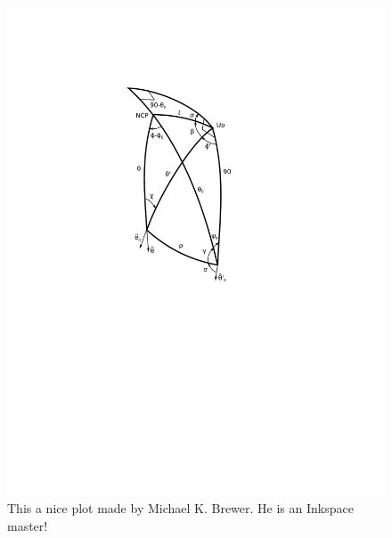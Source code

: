 \documentclass[a4paper,fleqn]{cas-dc}\sloppy
\begin{document}
\begin{figure}
	\centering
	\includegraphics[width=1.0\linewidth]{figures/PISCO_Drawing.pdf}
	\caption{This a nice plot made by Michael K. Brewer. He is an Inkspace master!}
	\label{fig::piscodrawing}
\end{figure}
\end{document}
